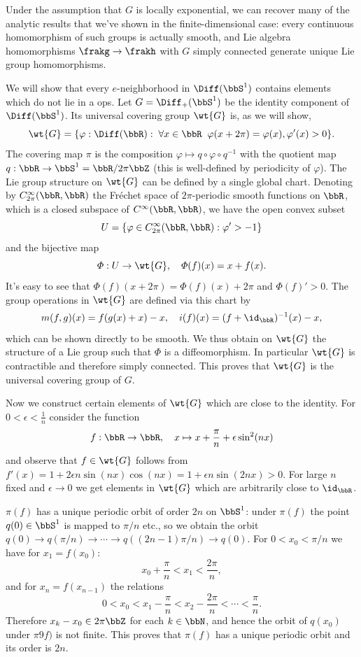 Under the assumption that $G$ is locally exponential, we can recover many of the analytic results that we've shown in the finite-dimensional case: every continuous homomorphism of such groups is actually smooth, and Lie algebra homomorphisms $\frakg\to \frakh$ with $G$ simply connected generate unique Lie group homomorphisms.

\begin{example}
    We will show that every $e$-neighborhood in $\Diff(\bbS^1)$ contains elements which do not lie in a \gls{ops}. Let $G=\Diff_+(\bbS^1)$ be the identity component of $\Diff(\bbS^1)$. Its universal covering group $\wt{G}$ is, as we will show,
    \[\wt{G}=\{\varphi:\Diff(\bbR):\; \forall x\in\bbR\;\;\varphi(x+2\pi)=\varphi(x),\varphi'(x)>0\}.\]
    The covering map $\pi$ is the composition $\varphi\mapsto q\circ \varphi\circ q^{-1}$ with the quotient map $q:\bbR\to \bbS^1=\bbR\slash 2\pi\bbZ$ (this is well-defined by periodicity of $\varphi$). The Lie group structure on $\wt{G}$ can be defined by a single global chart. Denoting by $C^\infty_{2\pi}(\bbR,\bbR)$ the Fr\'echet space of $2\pi$-periodic smooth functions on $\bbR$, which is a closed subspace of $C^\infty(\bbR,\bbR)$, we have the open convex subset 
    \[U=\{\varphi\in C^\infty_{2\pi}(\bbR,\bbR):\varphi'>-1\}\]
    and the bijective map
    \[\varPhi:U\to \wt{G},\quad \varPhi(f)(x)=x+f(x).\]
    It's easy to see that $\varPhi(f)(x+2\pi)=\varPhi(f)(x)+2\pi$ and $\varPhi(f)'>0$. The group operations in $\wt{G}$ are defined via this chart by
    \[m(f,g)(x)=f(g(x)+x)-x,\quad i(f)(x)=(f+\id_\bbR)^{-1}(x)-x,\]
    which can be shown directly to be smooth. We thus obtain on $\wt{G}$ the structure of a Lie group such that $\varPhi$ is a diffeomorphism. In particular $\wt{G}$ is contractible and therefore simply connected. This proves that $\wt{G}$ is the universal covering group of $G$.

    Now we construct certain elements of $\wt{G}$ which are close to the identity. For $0<\epsilon<\frac 1n$ consider the function
    \[f:\bbR\to\bbR,\quad x\mapsto x+\frac{\pi}{n}+\epsilon \sin^2(nx)\]
    and observe that $f\in\wt{G}$ follows from $f'(x)=1+2\epsilon n\sin(nx)\cos(nx)=1+\epsilon n\sin(2nx)>0$. For large $n$ fixed and $\epsilon\to 0$ we get elements in $\wt{G}$ which are arbitrarily close to $\id_\bbR$.

    $\pi(f)$ has a unique periodic orbit of order $2n$ on $\bbS^1$: under $\pi(f)$ the point $q(0)\in\bbS^1$ is mapped to $\pi/n$ etc., so we obtain the orbit $q(0)\to q(\pi/n)\to \cdots\to q((2n-1)\pi/n)\to q(0)$. For $0<x_0<\pi/n$ we have for $x_1=f(x_0)$:
    \[x_0+\frac \pi n<x_1<\frac{2\pi}{n},\]
    and for $x_n=f(x_{n-1})$ the relations
    \[0<x_0<x_1-\frac\pi n<x_2-\frac{2\pi}{n}<\cdots <\frac\pi n.\]
    Therefore $x_k-x_0\in 2\pi\bbZ$ for each $k\in \bbN$, and hence the orbit of $q(x_0)$ under $\pi9f)$ is not finite. This proves that $\pi(f)$ has a unique periodic orbit and its order is $2n$.


\end{example}
